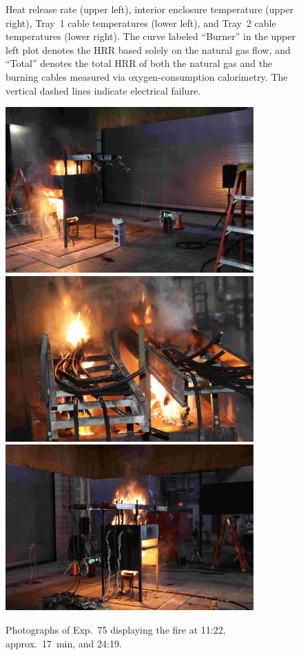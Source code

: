 \begin{figure}[H]
\caption[HRR and temperatures of Exp.~75]{Heat release rate (upper left), interior enclosure temperature (upper right), Tray~1 cable temperatures (lower left), and Tray~2 cable temperatures (lower right). The curve labeled ``Burner'' in the upper left plot denotes the HRR based solely on the natural gas flow, and ``Total'' denotes the total HRR of both the natural gas and the burning cables measured via oxygen-consumption calorimetry. The vertical dashed lines indicate electrical failure.}
\label{fig:Test_75}
\end{figure}

\begin{figure}[p]
\centering
\includegraphics[height=2.50in]{../FIGURES/Test_75_Photo_1} \\ \vspace{0.1in}
\includegraphics[height=2.50in]{../FIGURES/Test_75_Photo_2} \\ \vspace{0.1in}
\includegraphics[height=2.50in]{../FIGURES/Test_75_Photo_3}
\caption[Photographs of Exp.~75]{Photographs of Exp.~75 displaying the fire at 11:22, approx.~17~min, and 24:19.}
\label{fig:Test_75_photos}
\end{figure}


